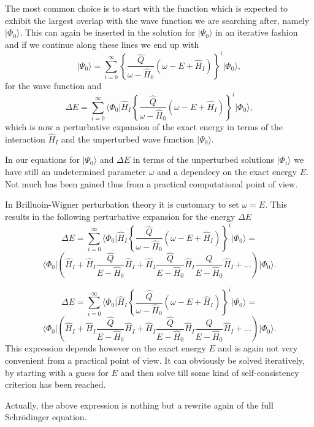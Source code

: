 \documentclass[graybox,sectrefs,envcountresetchap,open=right]{svmonodo}
\begin{document}
 The most common choice is to start with the function which is expected to exhibit the largest overlap with the wave function we are searching after, namely $\vert \Phi_0\rangle$. This can again be inserted in the solution for $\vert \Psi_0\rangle$ in an iterative fashion and if we continue along these lines we end up with
\[
\vert \Psi_0\rangle=\sum_{i=0}^{\infty}\left\{\frac{\hat{Q}}{\omega-\hat{H}_0}\left(\omega-E+\hat{H}_I\right)\right\}^i\vert \Phi_0\rangle, 
\]
for the wave function and
\[
\Delta E=\sum_{i=0}^{\infty}\langle \Phi_0\vert \hat{H}_I\left\{\frac{\hat{Q}}{\omega-\hat{H}_0}\left(\omega-E+\hat{H}_I\right)\right\}^i\vert \Phi_0\rangle, 
\]
which is now  a perturbative expansion of the exact energy in terms of the interaction
$\hat{H}_I$ and the unperturbed wave function $\vert \Psi_0\rangle$.



In our equations for $\vert \Psi_0\rangle$ and $\Delta E$ in terms of the unperturbed
solutions $\vert \Phi_i\rangle$  we have still an undetermined parameter $\omega$
and a dependecy on the exact energy $E$. Not much has been gained thus from a practical computational point of view. 

In Brilluoin-Wigner perturbation theory it is customary to set $\omega=E$. This results in the following perturbative expansion for the energy $\Delta E$
\[
\Delta E=\sum_{i=0}^{\infty}\langle \Phi_0\vert \hat{H}_I\left\{\frac{\hat{Q}}{\omega-\hat{H}_0}\left(\omega-E+\hat{H}_I\right)\right\}^i\vert \Phi_0\rangle=
\]
\[
\langle \Phi_0\vert \left(\hat{H}_I+\hat{H}_I\frac{\hat{Q}}{E-\hat{H}_0}\hat{H}_I+
\hat{H}_I\frac{\hat{Q}}{E-\hat{H}_0}\hat{H}_I\frac{\hat{Q}}{E-\hat{H}_0}\hat{H}_I+\dots\right)\vert \Phi_0\rangle. 
\]

\[
\Delta E=\sum_{i=0}^{\infty}\langle \Phi_0\vert \hat{H}_I\left\{\frac{\hat{Q}}{\omega-\hat{H}_0}\left(\omega-E+\hat{H}_I\right)\right\}^i\vert \Phi_0\rangle=\]
\[
\langle \Phi_0\vert \left(\hat{H}_I+\hat{H}_I\frac{\hat{Q}}{E-\hat{H}_0}\hat{H}_I+
\hat{H}_I\frac{\hat{Q}}{E-\hat{H}_0}\hat{H}_I\frac{\hat{Q}}{E-\hat{H}_0}\hat{H}_I+\dots\right)\vert \Phi_0\rangle. 
\]
This expression depends however on the exact energy $E$ and is again not very convenient from a practical point of view. It can obviously be solved iteratively, by starting with a guess for  $E$ and then solve till some kind of self-consistency criterion has been reached. 

Actually, the above expression is nothing but a rewrite again of the full Schr\"odinger equation. 
\end{document}
